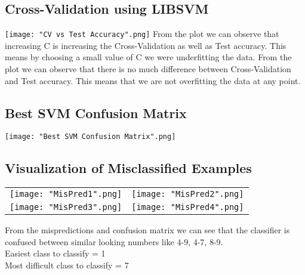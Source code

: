 \documentclass[12pt]{article}
\begin{document}
\subsection*{Cross-Validation using LIBSVM}
\begin{addmargin}[0.3in]{0in}
\texttt{[image: "CV vs Test Accuracy".png]}
\newline
From the plot we can observe that increasing C is increasing the Cross-Validation as well as Test accuracy. This means by choosing a small value of C we were underfitting the data. From the plot we can observe that there is no much difference between Cross-Validation and Test accuracy. This means that we are not overfitting the data at any point.
\end{addmargin}
\subsection*{Best SVM Confusion Matrix}
\begin{addmargin}[0.3in]{0in}
\texttt{[image: "Best SVM Confusion Matrix".png]}
\end{addmargin}
\subsection*{Visualization of Misclassified Examples}
\begin{addmargin}[0.3in]{0in}
\begin{tabular}{cc}
\texttt{[image: "MisPred1".png]} & \texttt{[image: "MisPred2".png]}\\
\texttt{[image: "MisPred3".png]} & \texttt{[image: "MisPred4".png]}\\
\end{tabular}
\newline
From the mispredictions and confusion matrix we can see that the classifier is confused between similar looking numbers like 4-9, 4-7, 8-9.\\
Easiest class to classify = 1\\
Most difficult class to classify = 7\\
\end{addmargin}
\end{document}
